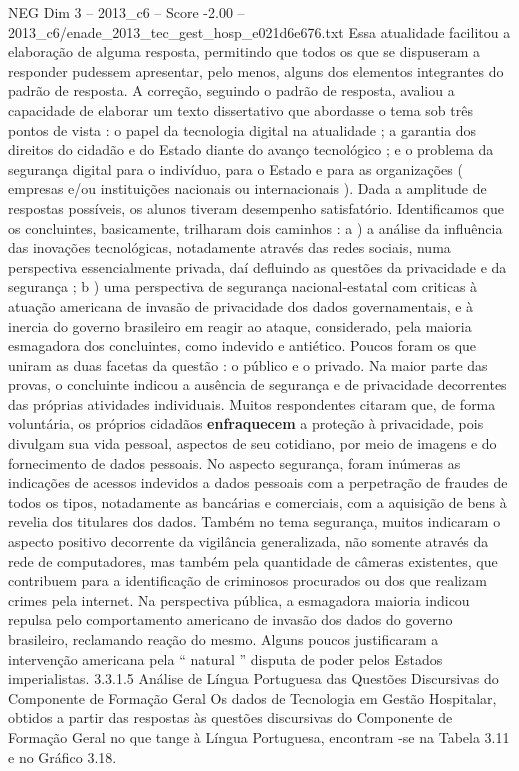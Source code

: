 \begin{textsample}{NEG Dim 3 – 2013\_c6 – Score -2.00 – 2013\_c6/enade\_2013\_tec\_gest\_hosp\_e021d6e676.txt}
Essa atualidade facilitou a elaboração de alguma resposta, permitindo que todos os que se dispuseram a responder pudessem apresentar, pelo menos, alguns dos elementos integrantes do padrão de resposta.
A correção, seguindo o padrão de resposta, avaliou a capacidade de elaborar um texto dissertativo que abordasse o tema sob três pontos de vista : o papel da tecnologia digital na atualidade ; a garantia dos direitos do cidadão e do Estado diante do avanço tecnológico ; e o problema da segurança digital para o indivíduo, para o Estado e para as organizações ( empresas e/ou instituições nacionais ou internacionais ).
Dada a amplitude de respostas possíveis, os alunos tiveram desempenho satisfatório.
Identificamos que os concluintes, basicamente, trilharam dois caminhos : a ) a análise da influência das inovações tecnológicas, notadamente através das redes sociais, numa perspectiva essencialmente privada, daí defluindo as questões da privacidade e da segurança ; b ) uma perspectiva de segurança nacional-estatal com criticas à atuação americana de invasão de privacidade dos dados governamentais, e à inercia do governo brasileiro em reagir ao ataque, considerado, pela maioria esmagadora dos concluintes, como indevido e antiético.
Poucos foram os que uniram as duas facetas da questão : o público e o privado.
Na maior parte das provas, o concluinte indicou a ausência de segurança e de privacidade decorrentes das próprias atividades individuais.
Muitos respondentes citaram que, de forma voluntária, os próprios cidadãos \textbf{enfraquecem} a proteção à privacidade, pois divulgam sua vida pessoal, aspectos de seu cotidiano, por meio de imagens e do fornecimento de dados pessoais.
No aspecto segurança, foram inúmeras as indicações de acessos indevidos a dados pessoais com a perpetração de fraudes de todos os tipos, notadamente as bancárias e comerciais, com a aquisição de bens à revelia dos titulares dos dados.
Também no tema segurança, muitos indicaram o aspecto positivo decorrente da vigilância generalizada, não somente através da rede de computadores, mas também pela quantidade de câmeras existentes, que contribuem para a identificação de criminosos procurados ou dos que realizam crimes pela internet.
Na perspectiva pública, a esmagadora maioria indicou repulsa pelo comportamento americano de invasão dos dados do governo brasileiro, reclamando reação do mesmo.
Alguns poucos justificaram a intervenção americana pela “ natural ” disputa de poder pelos Estados imperialistas. 3.3.1.5 Análise de Língua Portuguesa das Questões Discursivas do Componente de Formação Geral Os dados de Tecnologia em Gestão Hospitalar, obtidos a partir das respostas às questões discursivas do Componente de Formação Geral no que tange à Língua Portuguesa, encontram -se na Tabela 3.11 e no Gráfico 3.18.

\end{textsample}
